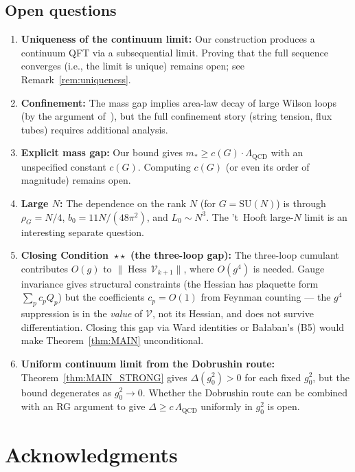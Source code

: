 \documentclass[11pt,a4paper]{article}
\theoremstyle{plain}
\theoremstyle{definition}
\theoremstyle{remark}
\newcommand{\Hess}{\operatorname{Hess}}
\newcommand{\SU}{\mathrm{SU}}
\newcommand{\cV}{\mathcal{V}}
\begin{document}
\subsection{Open questions}

\begin{enumerate}[nosep]
  \item \textbf{Uniqueness of the continuum limit:}
    Our construction produces a continuum QFT via a
    subsequential limit. Proving that the full sequence
    converges (i.e., the limit is unique) remains open;
    see Remark~\ref{rem:uniqueness}.
  \item \textbf{Confinement:} The mass gap implies
    area-law decay of large Wilson loops (by the argument
    of~\cite{OS78}), but the full confinement story
    (string tension, flux tubes) requires additional
    analysis.
  \item \textbf{Explicit mass gap:} Our bound gives
    $m_* \ge c(G) \cdot \Lambda_{\mathrm{QCD}}$ with
    an unspecified constant $c(G)$. Computing $c(G)$
    (or even its order of magnitude) remains open.
  \item \textbf{Large $N$:} The dependence on the rank $N$
    (for $G = \SU(N)$) is
    through $\rho_G = N/4$, $b_0 = 11N/(48\pi^2)$,
    and $L_0 \sim N^3$. The 't~Hooft large-$N$ limit is an
    interesting separate question.
  \item \textbf{Closing Condition~$\star\star$ (the three-loop gap):}
    The three-loop cumulant contributes $O(g)$ to
    $\|\Hess\,\cV_{k+1}\|$, where $O(g^4)$ is needed.
    Gauge invariance gives structural constraints (the
    Hessian has plaquette form $\sum_p c_p Q_p$) but the
    coefficients $c_p = O(1)$ from Feynman counting --- the
    $g^4$ suppression is in the \emph{value} of $\cV$, not
    its Hessian, and does not survive differentiation.
    Closing this gap via Ward identities or Ba\l{}aban's
    (B5) would make Theorem~\ref{thm:MAIN} unconditional.
  \item \textbf{Uniform continuum limit from the Dobrushin route:}
    Theorem~\ref{thm:MAIN_STRONG} gives $\Delta(g_0^2) > 0$
    for each fixed $g_0^2$, but the bound degenerates as
    $g_0^2 \to 0$. Whether the Dobrushin route can be combined
    with an RG argument to give $\Delta \ge c\,\Lambda_{\mathrm{QCD}}$
    uniformly in $g_0^2$ is open.
\end{enumerate}

\section*{Acknowledgments}
\end{document}
